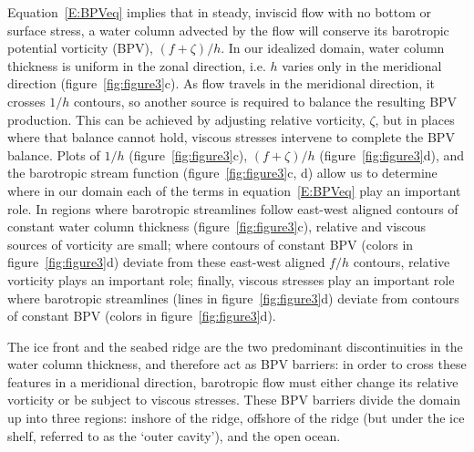 \documentclass[draft]{agujournal2019}
\begin{document}
Equation~\eqref{E:BPVeq} implies that in steady, inviscid flow with no bottom or surface stress, a water column advected by the flow will conserve its barotropic potential vorticity (BPV), $(f + \zeta)/h$. In our idealized domain, water column thickness is uniform in the zonal direction, i.e. $h$ varies only in the meridional direction (figure~\ref{fig:figure3}c). As flow travels in the meridional direction, it crosses $1/h$ contours, so another source is required to balance the resulting BPV production. This can be achieved by adjusting relative vorticity, $\zeta$, but in places where that balance cannot hold, viscous stresses intervene to complete the BPV balance. Plots of $1/h$ (figure~\ref{fig:figure3}c), $(f + \zeta)/h$ (figure~\ref{fig:figure3}d), and the barotropic stream function (figure~\ref{fig:figure3}c, d) allow us to determine where in our domain each of the terms in equation~\eqref{E:BPVeq} play an important role. In regions where barotropic streamlines follow east-west aligned contours of constant water column thickness (figure~\ref{fig:figure3}c), relative and viscous sources of vorticity are small; where contours of constant BPV (colors in figure~\ref{fig:figure3}d) deviate from these east-west aligned $f/h$ contours, relative vorticity plays an important role; finally, viscous stresses play an important role where barotropic streamlines (lines in figure~\ref{fig:figure3}d) deviate from contours of constant BPV (colors in figure~\ref{fig:figure3}d).

The ice front and the seabed ridge are the two predominant discontinuities in the water column thickness, and therefore act as BPV barriers: in order to cross these features in a meridional direction, barotropic flow must either change its relative vorticity or be subject to viscous stresses. These BPV barriers divide the domain up into three regions: inshore of the ridge, offshore of the ridge (but under the ice shelf, referred to as the `outer cavity'), and the open ocean. 
\end{document}
